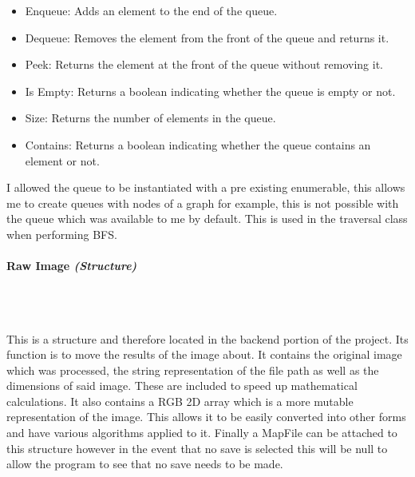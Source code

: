 \begin{FlushLeft}
    \begin{itemize}
        \item Enqueue: Adds an element to the end of the queue.
        \item Dequeue: Removes the element from the front of the queue and returns it.
        \item Peek: Returns the element at the front of the queue without removing it.
        \item Is Empty: Returns a boolean indicating whether the queue is empty or not.
        \item Size: Returns the number of elements in the queue.
        \item Contains: Returns a boolean indicating whether the queue contains an element or not.
    \end{itemize}

    I allowed the queue to be instantiated with a pre existing enumerable, this allows me to create queues with nodes of a graph for example, this is not possible with the queue which was available to me by default. This is used in the traversal class when performing BFS.\\

    \bk

    \pagebreak
\paragraph{Raw Image \textit{(Structure)}} \mbox{} \\

    \begin{figure}[H]
        \centering
    \end{figure}\\

    This is a structure and therefore located in the backend portion of the project. Its function is to move the results of the image about. It contains the original image which was processed, the string representation of the file path as well as the dimensions of said image. These are included to speed up mathematical calculations. It also contains a RGB 2D array which is a more mutable representation of the image. This allows it to be easily converted into other forms and have various algorithms applied to it. Finally a MapFile can be attached to this structure however in the event that no save is selected this will be null to allow the program to see that no save needs to be made.\\


\end{FlushLeft}
